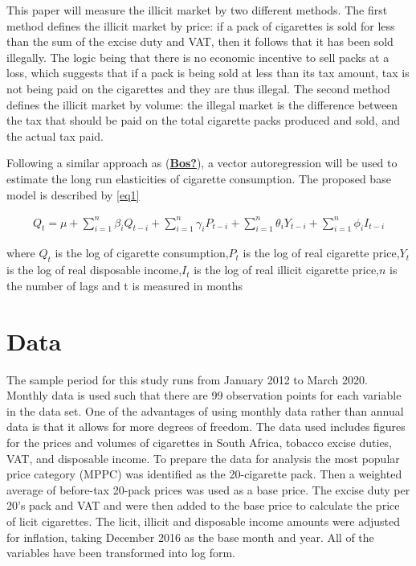 \documentclass[11pt,preprint, authoryear]{elsarticle}
\numberwithin{equation}{section}
\numberwithin{figure}{section}
\numberwithin{table}{section}
\begin{document}
This paper will measure the illicit market by two different methods. The
first method defines the illicit market by price: if a pack of
cigarettes is sold for less than the sum of the excise duty and VAT,
then it follows that it has been sold illegally. The logic being that
there is no economic incentive to sell packs at a loss, which suggests
that if a pack is being sold at less than its tax amount, tax is not
being paid on the cigarettes and they are thus illegal. The second
method defines the illicit market by volume: the illegal market is the
difference between the tax that should be paid on the total cigarette
packs produced and sold, and the actual tax paid.

Following a similar approach as
(\protect\hyperlink{ref-Bos}{\textbf{Bos?}}), a vector autoregression
will be used to estimate the long run elasticities of cigarette
consumption. The proposed base model is described by \ref{eq1}

\begin{align}
 Q_t = \mu + \sum_{i = 1}^{n}\beta_iQ_{t-i} +\sum_{i = 1}^{n}\gamma_iP_{t-i} + \sum_{i = 1}^{n}\theta_iY_{t-i} + \sum_{i = 1}^{n}\phi_iI_{t-i} \label{eq1}
\end{align}

where \(Q_t\) is the log of cigarette consumption,\newline \(P_{t}\) is
the log of real cigarette price,\newline \(Y_{t}\) is the log of real
disposable income,\newline \(I_{t}\) is the log of real illicit
cigarette price,\newline \(n\) is the number of lags and t is measured
in months

\hypertarget{data}{%
\section{\texorpdfstring{Data \label{dat}}{Data }}\label{data}}

The sample period for this study runs from January 2012 to March 2020.
Monthly data is used such that there are 99 observation points for each
variable in the data set. One of the advantages of using monthly data
rather than annual data is that it allows for more degrees of freedom.
The data used includes figures for the prices and volumes of cigarettes
in South Africa, tobacco excise duties, VAT, and disposable income. To
prepare the data for analysis the most popular price category (MPPC) was
identified as the 20-cigarette pack. Then a weighted average of
before-tax 20-pack prices was used as a base price. The excise duty per
20's pack and VAT and were then added to the base price to calculate the
price of licit cigarettes. The licit, illicit and disposable income
amounts were adjusted for inflation, taking December 2016 as the base
month and year. All of the variables have been transformed into log
form.
\end{document}
